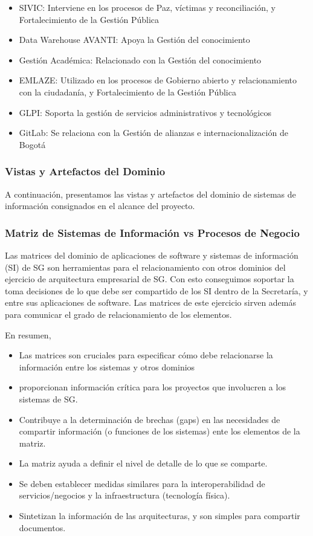 \documentclass[
	a4paper, %
	12pt, %
]{include/CSSullivanBusinessReport}
\def\tightlist{}
\begin{document}
\begin{itemize}
\item
  SIVIC: Interviene en los procesos de Paz, víctimas y reconciliación, y
  Fortalecimiento de la Gestión Pública
\item
  Data Warehouse AVANTI: Apoya la Gestión del conocimiento
\item
  Gestión Académica: Relacionado con la Gestión del conocimiento
\item
  EMLAZE: Utilizado en los procesos de Gobierno abierto y
  relacionamiento con la ciudadanía, y Fortalecimiento de la Gestión
  Pública
\item
  GLPI: Soporta la gestión de servicios administrativos y tecnológicos
\item
  GitLab: Se relaciona con la Gestión de alianzas e internacionalización
  de Bogotá
\end{itemize}

\subsubsection{Vistas y Artefactos del
Dominio}\label{sec:vistas-y-artefactos-del-dominio}

A continuación, presentamos las vistas y artefactos del dominio de
sistemas de información consignados en el alcance del proyecto.

\subsubsection{Matriz de Sistemas de Información vs Procesos de
Negocio}\label{sec:matriz-de-sistemas-de-informaciuxf3n-vs-procesos-de-negocio}

Las matrices del dominio de aplicaciones de software y sistemas de
información (SI) de SG son herramientas para el relacionamiento con
otros dominios del ejercicio de arquitectura empresarial de SG. Con esto
conseguimos soportar la toma decisiones de lo que debe ser compartido de
los SI dentro de la Secretaría, y entre sus aplicaciones de software.
Las matrices de este ejercicio sirven además para comunicar el grado de
relacionamiento de los elementos.

En resumen,

\begin{itemize}
\tightlist
\item
  Las matrices son cruciales para especificar cómo debe relacionarse la
  información entre los sistemas y otros dominios
\item
  proporcionan información crítica para los proyectos que involucren a
  los sistemas de SG.
\item
  Contribuye a la determinación de brechas (gaps) en las necesidades de
  compartir información (o funciones de los sistemas) ente los elementos
  de la matriz.
\item
  La matriz ayuda a definir el nivel de detalle de lo que se comparte.
\item
  Se deben establecer medidas similares para la interoperabilidad de
  servicios/negocios y la infraestructura (tecnología física).
\item
  Sintetizan la información de las arquitecturas, y son simples para
  compartir documentos.
\end{itemize}
\end{document}
